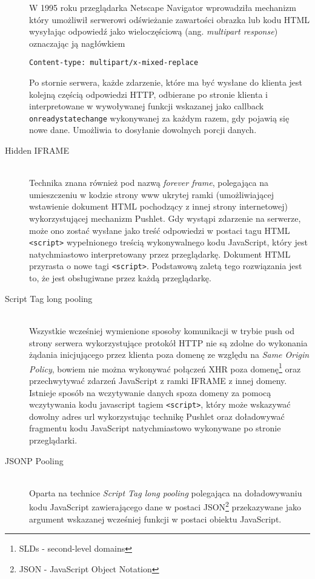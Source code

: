 \begin{description}
  W 1995 roku przeglądarka Netscape Navigator wprowadziła mechanizm który umożliwił serwerowi odświeżanie zawartości obrazka lub kodu HTML wysyłając odpowiedź jako wieloczęściową (ang. \emph{multipart response}) oznaczając ją nagłówkiem

\lstinline{Content-type: multipart/x-mixed-replace}\cite{xhr-rfc}

  Po stornie serwera, każde zdarzenie, które ma być wysłane do klienta jest kolejną częścią odpowiedzi HTTP, odbierane po stronie klienta i interpretowane w wywoływanej funkcji wskazanej jako callback \lstinline{onreadystatechange} wykonywanej za każdym razem, gdy pojawią się nowe dane. Umożliwia to dosyłanie dowolnych porcji danych.

  \item[Hidden IFRAME] \hfill \\
  Technika znana również pod nazwą \emph{forever frame}, polegająca na umieszczeniu w kodzie strony www ukrytej ramki (umożliwiającej wstawienie dokument HTML pochodzący z innej strony internetowej) wykorzystującej mechanizm Pushlet. Gdy wystąpi zdarzenie na serwerze, może ono zostać wysłane jako treść odpowiedzi w postaci tagu HTML
  \lstinline{<script>}
  wypełnionego treścią wykonywalnego kodu JavaScript, który jest natychmiastowo interpretowany przez przeglądarkę. Dokument HTML przyrasta o nowe tagi \lstinline{<script>}. Podstawową zaletą tego rozwiązania jest to, że jest obsługiwane przez każdą przeglądarkę.

  \item[Script Tag long pooling] \hfill \\
  Wszystkie wcześniej wymienione sposoby komunikacji w trybie push od strony serwera wykorzystujące protokół HTTP nie są zdolne do wykonania żądania inicjującego przez klienta poza domenę ze względu na \emph{Same Origin Policy}, bowiem nie można wykonywać połączeń XHR poza domenę\footnote{SLDs - second-level domains} oraz przechwytywać zdarzeń JavaScript z ramki IFRAME z innej domeny. Istnieje sposób na wczytywanie danych spoza domeny za pomocą wczytywania kodu javascript tagiem \lstinline{<script>}, który może wskazywać dowolny adres url wykorzystując technikę Pushlet oraz doładowywać fragmentu kodu JavaScript natychmiastowo wykonywane po stronie przeglądarki.
  
  \item[JSONP Pooling] \hfill \\
  Oparta na technice \emph{Script Tag long pooling} polegająca na doładowywaniu kodu JavaScript zawierającego dane w postaci JSON\footnote{JSON - JavaScript Object Notation} przekazywane jako argument wskazanej wcześniej funkcji w postaci obiektu JavaScript.
  

\end{description}
